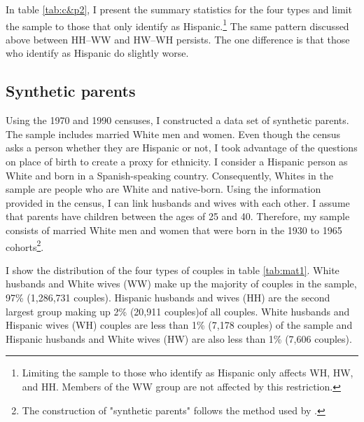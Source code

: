 \documentclass{wptemp}
\begin{document}
In table \ref{tab:c&p2}, I present the summary statistics for the four types and limit the sample to those that only identify as Hispanic.\footnote{Limiting the sample to those who identify as Hispanic only affects WH, HW, and HH. Members of the WW group are not affected by this restriction.} The same pattern discussed above between HH--WW and HW--WH persists. The one difference is that those who identify as Hispanic do slightly worse.

 
\subsection{Synthetic parents}

Using the 1970 and 1990 censuses, I constructed a data set of synthetic parents. The sample includes married White men and women. Even though the census asks a person whether they are Hispanic or not, I took advantage of the questions on place of birth to create a proxy for ethnicity. I consider a Hispanic person as White and born in a Spanish-speaking country. Consequently, Whites in the sample are people who are White and native-born. Using the information provided in the census, I can link husbands and wives with each other. I assume that parents have children between the ages of 25 and 40. Therefore, my sample consists of married White men and women that were born in the 1930 to 1965 cohorts\footnote{The construction of "synthetic parents" follows the method used by \citet{rubinstein2014pride}.}.

I show the distribution of the four types of couples in table \ref{tab:mat1}. White husbands and White wives (WW) make up the majority of couples in the sample, 97\% (1,286,731 couples). Hispanic husbands and wives (HH) are the second largest group making up 2\% (20,911 couples)of all couples. White husbands and Hispanic wives (WH) couples are less than 1\% (7,178 couples) of the sample and Hispanic husbands and White wives (HW) are also less than 1\% (7,606 couples). 
\end{document}
